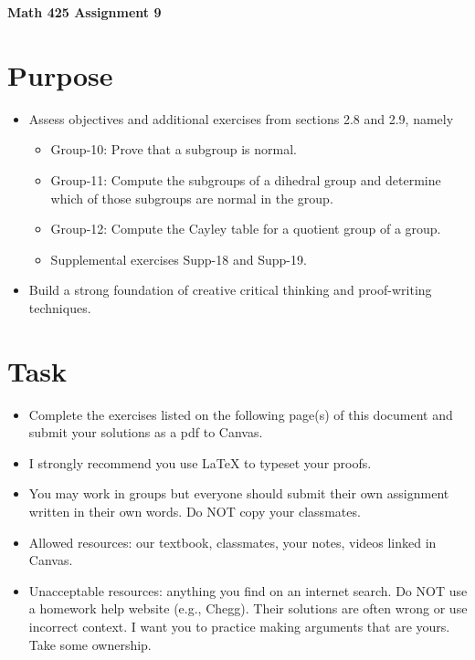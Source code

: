 \documentclass[12pt]{article}
\begin{document}
	\begin{center}
		{\Large \bf Math 425 Assignment 9}
	\end{center}
	\section*{Purpose}
	\begin{itemize}
		\item Assess objectives and additional exercises from sections 2.8 and 2.9, namely
		\begin{itemize} 
			\item Group-10:	Prove that a subgroup is normal.
			\item Group-11:	Compute the subgroups of a dihedral group and determine which of those subgroups are normal in the group.
			\item Group-12:	Compute the Cayley table for a quotient group of a group.
			\item Supplemental exercises Supp-18 and Supp-19.
		\end{itemize}
		\item Build a strong foundation of creative critical thinking and proof-writing techniques.
	\end{itemize}
	\section*{Task}
	\begin{itemize}
		\item Complete the exercises listed on the following page(s) of this document and submit your solutions as a pdf to Canvas.
		\item I strongly recommend you use LaTeX to typeset your proofs.
		\item You may work in groups but everyone should submit their own assignment written in their own words.  Do NOT copy your classmates.
		\item Allowed resources: our textbook, classmates, your notes, videos linked in Canvas.
		\item Unacceptable resources: anything you find on an internet search. Do NOT use a homework help website (e.g., Chegg). Their solutions are often wrong or use incorrect context.  I want you to practice making arguments that are yours. Take some ownership.
	\end{itemize}
\end{document}
